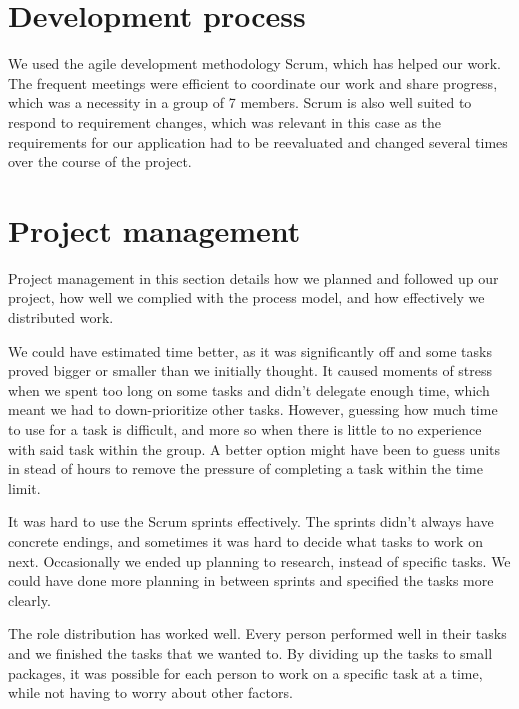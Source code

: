 \section{Development process}

We used the agile development methodology Scrum, which has helped our work. The frequent meetings were efficient to coordinate our work and share progress, which was a necessity in a group of 7 members. Scrum is also well suited to respond to requirement changes, which was relevant in this case as the requirements for our application had to be reevaluated and changed several times over the course of the project.

\section{Project management}

Project management in this section details how we planned and followed up our project, how well we complied with the process model, and how effectively we distributed work.\newline

We could have estimated time better, as it was significantly off and some tasks proved bigger or smaller than we initially thought. It caused moments of stress when we spent too long on some tasks and didn't delegate enough time, which meant we had to down-prioritize other tasks. However, guessing how much time to use for a task is difficult, and more so when there is little to no experience with said task within the group. A better option might have been to guess units in stead of hours to remove the pressure of completing a task within the time limit.\newline

It was hard to use the Scrum sprints effectively. The sprints didn't always have concrete endings, and sometimes it was hard to decide what tasks to work on next. Occasionally we ended up planning to research, instead of specific tasks. We could have done more planning in between sprints and specified the tasks more clearly.\newline

The role distribution has worked well. Every person performed well in their tasks and we finished the tasks that we wanted to. By dividing up the tasks to small packages, it was possible for each person to work on a specific task at a time, while not having to worry about other factors.\newline

